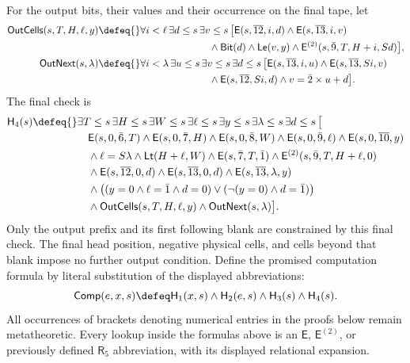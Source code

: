 \begin{definition}
For the output bits, their values and their occurrence on the final tape,
let
\[
\begin{aligned}
 \mathsf{OutCells}(s,T,H,\ell,y)\defeq{}&
  \forall i<\ell\,\exists d\leq s\,\exists v\leq s\,\bigl[
     \mathsf E(s,\overline{12},i,d)
      \land\mathsf E(s,\overline{13},i,v)\\
 &\hspace{24mm}\land\mathsf{Bit}(d)\land\mathsf{Le}(v,y)
      \land\mathsf E^{(2)}(s,\bar9,T,H+i,Sd)\bigr],\\
 \mathsf{OutNext}(s,\lambda)\defeq{}&
  \forall i<\lambda\,\exists u\leq s\,\exists v\leq s\,
    \exists d\leq s\,\bigl[
      \mathsf E(s,\overline{13},i,u)
        \land\mathsf E(s,\overline{13},Si,v)\\
 &\hspace{24mm}\land\mathsf E(s,\overline{12},Si,d)
        \land v=\bar2\times u+d\bigr].
\end{aligned}
\]
The final check is
\[
\begin{aligned}
 \mathsf H_4(s)\defeq{}&
  \exists T\leq s\,\exists H\leq s\,\exists W\leq s\,
  \exists\ell\leq s\,\exists y\leq s\,
  \exists\lambda\leq s\,\exists d\leq s\,\bigl[\\
 &\quad\mathsf E(s,0,\bar6,T)\land\mathsf E(s,0,\bar7,H)
       \land\mathsf E(s,0,\bar8,W)
       \land\mathsf E(s,0,\bar9,\ell)
       \land\mathsf E(s,0,\overline{10},y)\\
 &\quad\land\ell=S\lambda\land\mathsf{Lt}(H+\ell,W)
       \land\mathsf E(s,\bar7,T,\bar1)
       \land\mathsf E^{(2)}(s,\bar9,T,H+\ell,0)\\
 &\quad\land\mathsf E(s,\overline{12},0,d)
       \land\mathsf E(s,\overline{13},0,d)
       \land\mathsf E(s,\overline{13},\lambda,y)\\
 &\quad\land\bigl((y=0\land\ell=\bar1\land d=0)
                    \lor(\neg(y=0)\land d=\bar1)\bigr)\\
 &\quad\land\mathsf{OutCells}(s,T,H,\ell,y)
       \land\mathsf{OutNext}(s,\lambda)\bigr].
\end{aligned}
\]
Only the output prefix and its first following blank are constrained
by this final check.  The final head position, negative physical cells,
and cells beyond that blank impose no further output condition.
Define the promised computation formula by literal substitution of
the displayed abbreviations:
\[
 \mathsf{Comp}(e,x,s)\defeq
   \mathsf H_1(x,s)\land\mathsf H_2(e,s)
                   \land\mathsf H_3(s)\land\mathsf H_4(s).
\]
All occurrences of brackets denoting numerical entries in the proofs
below remain metatheoretic.  Every lookup inside the formulas above
is an \(\mathsf E\), \(\mathsf E^{(2)}\), or previously defined
\(\mathsf R_5\) abbreviation, with its displayed relational expansion.
\end{definition}

